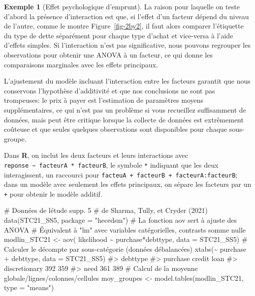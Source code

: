 \documentclass[
  11pt,
  letterpaper,
]{scrbook}
\newenvironment{Shaded}{\begin{snugshade}}{\end{snugshade}}
\newcommand{\AttributeTok}[1]{\textcolor[rgb]{0.40,0.45,0.13}{#1}}
\newcommand{\CommentTok}[1]{\textcolor[rgb]{0.37,0.37,0.37}{#1}}
\newcommand{\FunctionTok}[1]{\textcolor[rgb]{0.28,0.35,0.67}{#1}}
\newcommand{\NormalTok}[1]{\textcolor[rgb]{0.00,0.23,0.31}{#1}}
\newcommand{\OtherTok}[1]{\textcolor[rgb]{0.00,0.23,0.31}{#1}}
\newcommand{\SpecialCharTok}[1]{\textcolor[rgb]{0.37,0.37,0.37}{#1}}
\newcommand{\StringTok}[1]{\textcolor[rgb]{0.13,0.47,0.30}{#1}}
\theoremstyle{plain}
\theoremstyle{plain}
\theoremstyle{definition}
\newtheorem{example}{Exemple}[chapter]
\theoremstyle{definition}
\theoremstyle{remark}
\begin{document}
\begin{example}[Effet psychologique
d'emprunt]
La raison pour laquelle on teste d'abord la présence d'interaction est
que, si l'effet d'un facteur dépend du niveau de l'autre, comme le
montre Figure~\ref{fig-2by2}, il faut alors comparer l'étiquette du type
de dette séparément pour chaque type d'achat et vice-versa à l'aide
d'effets simples. Si l'interaction n'est pas significative, nous pouvons
regrouper les observations pour obtenir une ANOVA à un facteur, ce qui
donne les comparaisons marginales avec les effets principaux.

L'ajustement du modèle incluant l'interaction entre les facteurs
garantit que nous conservons l'hypothèse d'additivité et que nos
conclusions ne sont pas trompeuses: le prix à payer est l'estimation de
paramètres moyens supplémentaires, ce qui n'est pas un problème si vous
recueillez suffisamment de données, mais peut être critique lorsque la
collecte de données est extrêmement coûteuse et que seules quelques
observations sont disponibles pour chaque sous-groupe.

Dans \textbf{R}, on inclut les deux facteurs et leurs interactions avec
\texttt{reponse\ \textasciitilde{}\ facteurA\ *\ facteurB}, le symbole
\texttt{*} indiquant que les deux interagissent, un raccourci pour
\texttt{facteuA\ +\ facteurB\ +\ facteurA:facteurB}; dans un modèle avec
seulement les effets principaux, on sépare les facteurs par un
\texttt{+} pour obtenir le modèle additif.

\begin{Shaded}
\begin{Highlighting}[]
\CommentTok{\# Données de l\textquotesingle{}étude supp. 5}
\CommentTok{\# de Sharma, Tully, et Cryder (2021)}
\FunctionTok{data}\NormalTok{(STC21\_SS5, }\AttributeTok{package =} \StringTok{"hecedsm"}\NormalTok{)}
\CommentTok{\# La fonction \textquotesingle{}aov\textquotesingle{} sert à ajuste des ANOVA}
\CommentTok{\# Équivalent à "lm" avec variables catégorielles, contrasts somme nulle}
\NormalTok{modlin\_STC21 }\OtherTok{\textless{}{-}} \FunctionTok{aov}\NormalTok{(}
\NormalTok{    likelihood }\SpecialCharTok{\textasciitilde{}}\NormalTok{ purchase}\SpecialCharTok{*}\NormalTok{debttype, }
    \AttributeTok{data =}\NormalTok{ STC21\_SS5)}
\CommentTok{\# Calculer le décompte par sous{-}catégorie (données débalancées)}
\FunctionTok{xtabs}\NormalTok{(}\SpecialCharTok{\textasciitilde{}}\NormalTok{ purchase }\SpecialCharTok{+}\NormalTok{ debttype, }\AttributeTok{data =}\NormalTok{ STC21\_SS5)}
\CommentTok{\#\textgreater{}                debttype}
\CommentTok{\#\textgreater{} purchase        credit loan}
\CommentTok{\#\textgreater{}   discretionary    392  359}
\CommentTok{\#\textgreater{}   need             361  389}
\CommentTok{\# Calcul de la moyenne globale/lignes/colonnes/cellules}
\NormalTok{moy\_groupes }\OtherTok{\textless{}{-}} \FunctionTok{model.tables}\NormalTok{(modlin\_STC21, }\AttributeTok{type =} \StringTok{"means"}\NormalTok{)}


\end{Highlighting}
\end{Shaded}
\end{example}
\end{document}
